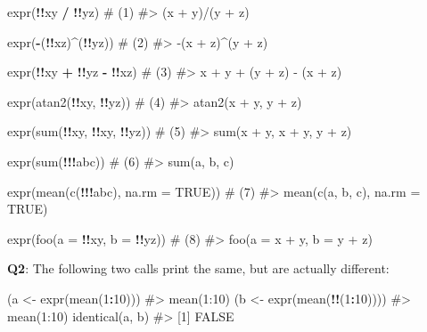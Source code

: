 \documentclass[
]{krantz}
\makeatletter
\newenvironment{Shaded}{\begin{snugshade}}{\end{snugshade}}
\newcommand{\CommentTok}[1]{\textcolor[rgb]{0.56,0.35,0.01}{\textit{#1}}}
\newcommand{\DataTypeTok}[1]{\textcolor[rgb]{0.13,0.29,0.53}{#1}}
\newcommand{\DecValTok}[1]{\textcolor[rgb]{0.00,0.00,0.81}{#1}}
\newcommand{\KeywordTok}[1]{\textcolor[rgb]{0.13,0.29,0.53}{\textbf{#1}}}
\newcommand{\NormalTok}[1]{#1}
\newcommand{\OperatorTok}[1]{\textcolor[rgb]{0.81,0.36,0.00}{\textbf{#1}}}
\newcommand{\OtherTok}[1]{\textcolor[rgb]{0.56,0.35,0.01}{#1}}
\newcommand{\StringTok}[1]{\textcolor[rgb]{0.31,0.60,0.02}{#1}}
\newenvironment{kframe}{%
\medskip{}
\setlength{\fboxsep}{.8em}
 \def\at@end@of@kframe{}%
 \ifinner\ifhmode%
  \def\at@end@of@kframe{\end{minipage}}%
  \begin{minipage}{\columnwidth}%
 \fi\fi%
 \def\FrameCommand##1{\hskip\@totalleftmargin \hskip-\fboxsep
 \colorbox{shadecolor}{##1}\hskip-\fboxsep
     \hskip-\linewidth \hskip-\@totalleftmargin \hskip\columnwidth}%
 \MakeFramed {\advance\hsize-\width
   \@totalleftmargin\z@ \linewidth\hsize
   \@setminipage}}%
 {\par\unskip\endMakeFramed%
 \at@end@of@kframe}
\renewenvironment{Shaded}{\begin{kframe}}{\end{kframe}}
\renewcommand{\KeywordTok} [1]{\textcolor[rgb]{0.00,0.44,0.13}{{#1}}}
\renewcommand{\DataTypeTok}[1]{\textcolor[rgb]{0.56,0.13,0.00}{{#1}}}
\renewcommand{\DecValTok}  [1]{\textcolor[rgb]{0.25,0.63,0.44}{{#1}}}
\renewcommand{\StringTok}  [1]{\textcolor[rgb]{0.25,0.44,0.63}{{#1}}}
\renewcommand{\CommentTok} [1]{\textcolor[rgb]{0.38,0.63,0.69}{{#1}}}
\renewcommand{\OtherTok}   [1]{\textcolor[rgb]{0.00,0.44,0.13}{{#1}}}
\renewcommand{\NormalTok}  [1]{{#1}}
\makeatother
\begin{document}
\begin{Shaded}
\begin{Highlighting}[]
\KeywordTok{expr}\NormalTok{(}\OperatorTok{!!}\NormalTok{xy }\OperatorTok{/}\StringTok{ }\OperatorTok{!!}\NormalTok{yz)                    }\CommentTok{# (1)}
\CommentTok{#> (x + y)/(y + z)}

\KeywordTok{expr}\NormalTok{(}\OperatorTok{-}\NormalTok{(}\OperatorTok{!!}\NormalTok{xz)}\OperatorTok{^}\NormalTok{(}\OperatorTok{!!}\NormalTok{yz))                 }\CommentTok{# (2)}
\CommentTok{#> -(x + z)^(y + z)}

\KeywordTok{expr}\NormalTok{(}\OperatorTok{!!}\NormalTok{xy }\OperatorTok{+}\StringTok{ }\OperatorTok{!!}\NormalTok{yz }\OperatorTok{-}\StringTok{ }\OperatorTok{!!}\NormalTok{xz)             }\CommentTok{# (3)}
\CommentTok{#> x + y + (y + z) - (x + z)}

\KeywordTok{expr}\NormalTok{(}\KeywordTok{atan2}\NormalTok{(}\OperatorTok{!!}\NormalTok{xy, }\OperatorTok{!!}\NormalTok{yz))              }\CommentTok{# (4)}
\CommentTok{#> atan2(x + y, y + z)}

\KeywordTok{expr}\NormalTok{(}\KeywordTok{sum}\NormalTok{(}\OperatorTok{!!}\NormalTok{xy, }\OperatorTok{!!}\NormalTok{xy, }\OperatorTok{!!}\NormalTok{yz))          }\CommentTok{# (5)}
\CommentTok{#> sum(x + y, x + y, y + z)}

\KeywordTok{expr}\NormalTok{(}\KeywordTok{sum}\NormalTok{(}\OperatorTok{!!!}\NormalTok{abc))                    }\CommentTok{# (6)}
\CommentTok{#> sum(a, b, c)}

\KeywordTok{expr}\NormalTok{(}\KeywordTok{mean}\NormalTok{(}\KeywordTok{c}\NormalTok{(}\OperatorTok{!!!}\NormalTok{abc), }\DataTypeTok{na.rm =} \OtherTok{TRUE}\NormalTok{))  }\CommentTok{# (7)}
\CommentTok{#> mean(c(a, b, c), na.rm = TRUE)}

\KeywordTok{expr}\NormalTok{(}\KeywordTok{foo}\NormalTok{(}\DataTypeTok{a =} \OperatorTok{!!}\NormalTok{xy, }\DataTypeTok{b =} \OperatorTok{!!}\NormalTok{yz))        }\CommentTok{# (8)}
\CommentTok{#> foo(a = x + y, b = y + z)}
\end{Highlighting}
\end{Shaded}

\textbf{{Q2}}: The following two calls print the same, but are actually different:

\begin{Shaded}
\begin{Highlighting}[]
\NormalTok{(a <-}\StringTok{ }\KeywordTok{expr}\NormalTok{(}\KeywordTok{mean}\NormalTok{(}\DecValTok{1}\OperatorTok{:}\DecValTok{10}\NormalTok{)))}
\CommentTok{#> mean(1:10)}
\NormalTok{(b <-}\StringTok{ }\KeywordTok{expr}\NormalTok{(}\KeywordTok{mean}\NormalTok{(}\OperatorTok{!!}\NormalTok{(}\DecValTok{1}\OperatorTok{:}\DecValTok{10}\NormalTok{))))}
\CommentTok{#> mean(1:10)}
\KeywordTok{identical}\NormalTok{(a, b)}
\CommentTok{#> [1] FALSE}
\end{Highlighting}
\end{Shaded}
\end{document}
